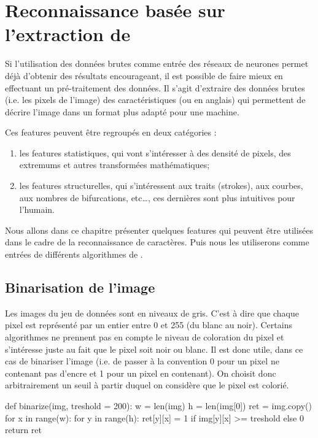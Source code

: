 
\chapter{Reconnaissance basée sur l'extraction de }




Si l'utilisation des données brutes comme entrée des réseaux de neurones 
permet déjà d'obtenir des résultats encourageant, il est possible de faire 
mieux en effectuant un pré-traitement des données. 
Il s'agit d'extraire des données brutes (i.e.\/ les pixels de l'image) des 
caractéristiques (ou  en anglais) qui permettent de décrire 
l'image dans un format plus adapté pour une machine.

Ces features peuvent être regroupés en deux catégories : 
\begin{enumerate}
  \item les features statistiques, qui vont s'intéresser à des densité de pixels, 
  des extremums et autres transformées mathématiques;
  \item les features structurelles, qui s’intéressent aux traits (strokes), aux courbes,
  aux nombres de bifurcations, etc…, ces dernières sont plus intuitives pour l’humain.
\end{enumerate}

Nous allons dans ce chapitre présenter quelques features qui peuvent être 
utilisées dans le cadre de la reconnaissance de caractères. Puis nous les utiliserons 
comme entrées de différents algorithmes de .



\section{Binarisation de l'image}



Les images du jeu de données sont en niveaux de gris. 
C'est à dire que chaque pixel est représenté par un entier entre 0 
et 255 (du blanc au noir). 
Certains algorithmes ne prennent pas en compte le niveau de coloration 
du pixel et s'intéresse juste au fait que le pixel soit noir ou blanc. 
Il est donc utile, dans ce cas de binariser l'image (i.e.\/ de passer 
à la convention 0 pour un pixel ne contenant pas d'encre et 1 pour 
un pixel en contenant). 
On choisit donc arbitrairement un seuil à partir duquel on considère que 
le pixel est colorié.

\begin{codeblock}
def binarize(img, treshold = 200):
    w = len(img)
    h = len(img[0])
    ret = img.copy()
    for x in range(w):
        for y in range(h):
            ret[y][x] = 1 if img[y][x] >= treshold else 0
    return ret
\end{codeblock}

